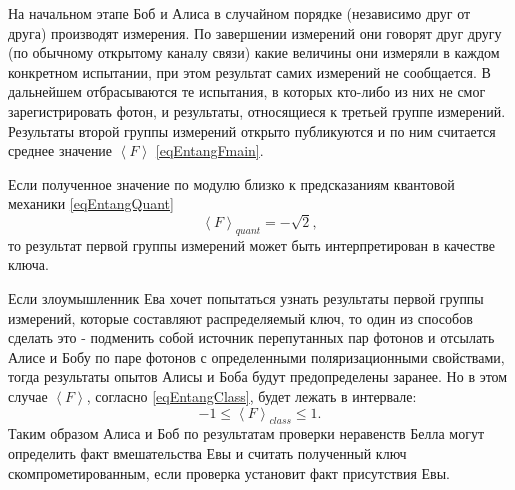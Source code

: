 На начальном этапе Боб и Алиса в случайном порядке (независимо друг от
друга) производят измерения. По завершении измерений они говорят друг
другу (по обычному открытому каналу связи) какие величины они измеряли
в каждом конкретном испытании, при этом результат самих измерений не
сообщается. В дальнейшем отбрасываются те испытания, в которых кто-либо
из них не смог зарегистрировать фотон, и результаты, относящиеся к
третьей группе измерений. Результаты второй группы измерений открыто
публикуются и по ним считается среднее значение $\left<F\right>$
\eqref{eqEntangFmain}. 

Если полученное значение по модулю близко к предсказаниям квантовой
механики \eqref{eqEntangQuant}
\[
\left<F\right>_{quant} = - \sqrt{2},
\]
то результат первой группы измерений может быть
интерпретирован в качестве ключа. 

Если злоумышленник Ева хочет попытаться узнать результаты первой
группы измерений, которые составляют распределяемый ключ, то
один из способов сделать это - подменить собой источник
перепутанных пар фотонов и отсылать Алисе и Бобу по паре фотонов с
определенными поляризационными свойствами, тогда результаты
опытов Алисы и Боба будут предопределены заранее. Но в этом случае
$\left<F\right>$, согласно \eqref{eqEntangClass}, будет лежать в
интервале:
\[
-1 \le \left<F\right>_{class} \le 1.
\]
Таким образом Алиса и Боб по результатам проверки неравенств Белла
могут определить факт вмешательства Евы и считать полученный
ключ скомпрометированным, если проверка установит факт присутствия Евы.


